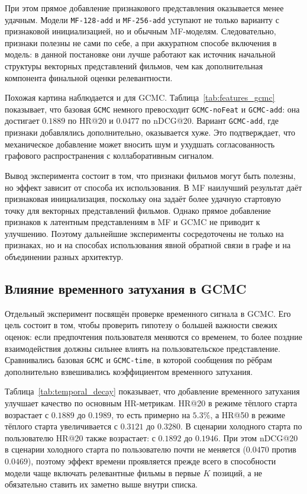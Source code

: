 \documentclass[12pt,fleqn]{article}
\begin{document}
При этом прямое добавление признакового представления оказывается менее
удачным. Модели \texttt{MF-128-add} и \texttt{MF-256-add} уступают не только
варианту с признаковой инициализацией, но и обычным MF-моделям. Следовательно,
признаки полезны не сами по себе, а при аккуратном способе включения в модель:
в данной постановке они лучше работают как источник начальной структуры
векторных представлений фильмов, чем как дополнительная компонента финальной оценки релевантности.



Похожая картина наблюдается и для GCMC. Таблица~\ref{tab:features_gcmc}
показывает, что базовая \texttt{GCMC} немного превосходит \texttt{GCMC-noFeat}
и \texttt{GCMC-add}: она достигает $0.1889$ по HR@20 и $0.0477$ по nDCG@20.
Вариант \texttt{GCMC-add}, где признаки добавлялись дополнительно, оказывается
хуже. Это подтверждает, что механическое добавление может
вносить шум и ухудшать согласованность графового распространения с
коллаборативным сигналом.

Вывод эксперимента состоит в том, что признаки фильмов могут быть полезны,
но эффект зависит от способа их использования. В MF наилучший результат даёт
признаковая инициализация, поскольку она задаёт более удачную стартовую точку
для векторных представлений фильмов. Однако прямое добавление признаков к латентным
представлениям в MF и GCMC не приводит к улучшению. Поэтому дальнейшие
эксперименты сосредоточены не только на признаках, но и на способах
использования явной обратной связи в графе и на объединении разных архитектур.

\subsection{Влияние временного затухания в GCMC}
\label{subsec:experiment_temporal_gcmc}

Отдельный эксперимент посвящён проверке временного сигнала в GCMC. Его цель
состоит в том, чтобы проверить гипотезу о большей важности свежих оценок:
если предпочтения пользователя меняются со временем, то более поздние
взаимодействия должны сильнее влиять на пользовательское представление.
Сравнивались базовая \texttt{GCMC} и \texttt{GCMC-time}, в которой сообщения
по рёбрам дополнительно взвешивались коэффициентом временного затухания.



Таблица~\ref{tab:temporal_decay} показывает, что добавление временного
затухания улучшает качество по основным HR-метрикам. HR@20 в режиме тёплого старта возрастает
с $0.1889$ до $0.1989$, то есть примерно на $5.3\%$, а HR@50 в режиме тёплого старта увеличивается с
$0.3121$ до $0.3280$. В сценарии холодного старта по пользователю HR@20 также возрастает: с
$0.1892$ до $0.1946$. При этом nDCG@20 в сценарии холодного старта по пользователю почти не меняется
($0.0470$ против $0.0469$), поэтому эффект времени проявляется прежде всего
в способности модели чаще включать релевантные фильмы в первые $K$ позиций, а не
обязательно ставить их заметно выше внутри списка.
\end{document}

